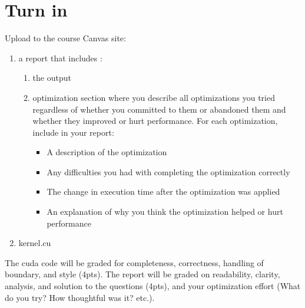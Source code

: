 \documentclass{article}
\begin{document}
\section{Turn in}
Upload to the course Canvas site:
\begin{enumerate}
\item a report that includes :
	\begin{enumerate}
	\item the output 
	\item optimization section where you describe all optimizations you tried regardless of whether you committed to them or abandoned them and whether they improved or hurt performance. For each optimization, include in your report:
		\begin{itemize}
		\item A description of the optimization
		\item Any difficulties you had with completing the optimization correctly
		\item The change in execution time after the optimization was applied
		\item An explanation of why you think the optimization helped or hurt performance
		\end{itemize}
	\end{enumerate}
\item kernel.cu
\end{enumerate} 


The cuda code will be graded for completeness, correctness, handling of boundary, and style (4pts).  The report will be graded on readability, clarity, analysis, and solution to the questions (4pts), and your optimization effort (What do you try? How thoughtful was it? etc.).
\end{document}
